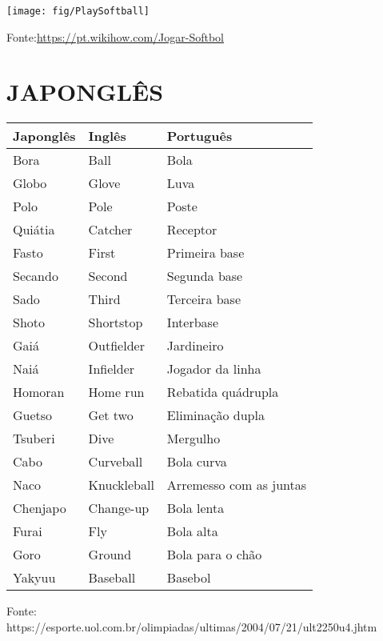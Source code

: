 	\texttt{[image: fig/PlaySoftball]}	
	\par Fonte:\url{https://pt.wikihow.com/Jogar-Softbol}

\chapter{JAPONGLÊS}

		\begin{center}
			\begin{tabular}{lll}
				Japonglês & Inglês      & Português               \\\hline\hline
				Bora      & Ball        & Bola                    \\\hline
				Globo     & Glove       & Luva                    \\\hline
				Polo      & Pole        & Poste                   \\\hline
				Quiátia   & Catcher     & Receptor                \\\hline
				Fasto     & First       & Primeira base           \\\hline
				Secando   & Second      & Segunda base            \\\hline
				Sado      & Third       & Terceira base           \\\hline
				Shoto     & Shortstop   & Interbase               \\\hline
				Gaiá      & Outfielder  & Jardineiro              \\\hline
				Naiá      & Infielder   & Jogador da linha        \\\hline
				Homoran   & Home run    & Rebatida quádrupla      \\\hline
				Guetso    & Get two     & Eliminação dupla        \\\hline
				Tsuberi   & Dive        & Mergulho                \\\hline
				Cabo      & Curveball   & Bola curva              \\\hline
				Naco      & Knuckleball & Arremesso com as juntas \\\hline
				Chenjapo  & Change-up   & Bola lenta              \\\hline
				Furai     & Fly         & Bola alta               \\\hline
				Goro      & Ground      & Bola para o chão       \\\hline
				Yakyuu    & Baseball	& Basebol
			\end{tabular}
			
			\footnotesize{Fonte: https://esporte.uol.com.br/olimpiadas/ultimas/2004/07/21/ult2250u4.jhtm}
		\end{center}

